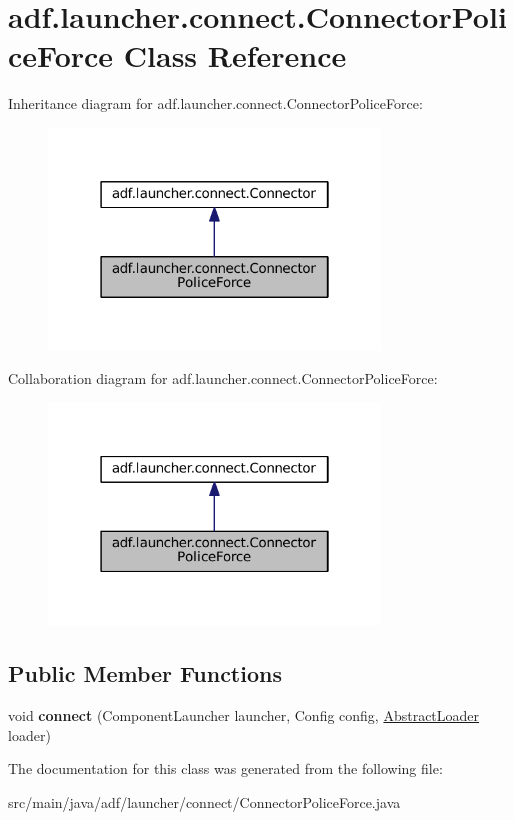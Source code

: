 \hypertarget{classadf_1_1launcher_1_1connect_1_1ConnectorPoliceForce}{}\section{adf.\+launcher.\+connect.\+Connector\+Police\+Force Class Reference}
\label{classadf_1_1launcher_1_1connect_1_1ConnectorPoliceForce}


Inheritance diagram for adf.\+launcher.\+connect.\+Connector\+Police\+Force\+:
\nopagebreak
\begin{figure}[H]
\begin{center}
\leavevmode
\includegraphics[width=250pt]{classadf_1_1launcher_1_1connect_1_1ConnectorPoliceForce__inherit__graph}
\end{center}
\end{figure}


Collaboration diagram for adf.\+launcher.\+connect.\+Connector\+Police\+Force\+:
\nopagebreak
\begin{figure}[H]
\begin{center}
\leavevmode
\includegraphics[width=250pt]{classadf_1_1launcher_1_1connect_1_1ConnectorPoliceForce__coll__graph}
\end{center}
\end{figure}
\subsection*{Public Member Functions}
\begin{DoxyCompactItemize}
\item 
\hypertarget{classadf_1_1launcher_1_1connect_1_1ConnectorPoliceForce_a21bcf528d065965b241cec3d77c0bed8}{}\label{classadf_1_1launcher_1_1connect_1_1ConnectorPoliceForce_a21bcf528d065965b241cec3d77c0bed8} 
void {\bfseries connect} (Component\+Launcher launcher, Config config, \hyperlink{classadf_1_1component_1_1AbstractLoader}{Abstract\+Loader} loader)
\end{DoxyCompactItemize}


The documentation for this class was generated from the following file\+:\begin{DoxyCompactItemize}
\item 
src/main/java/adf/launcher/connect/Connector\+Police\+Force.\+java\end{DoxyCompactItemize}
